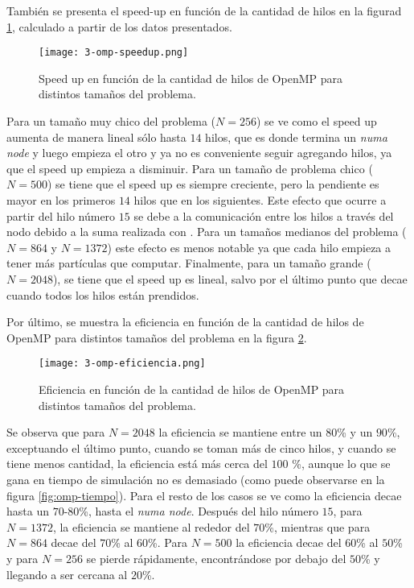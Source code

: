 \documentclass[a4paper,spanish,12pt,twoside]{article}
\begin{document}
También se presenta el speed-up en función de la cantidad de hilos en la figurad \ref{fig:omp-speedup}, calculado a partir de los datos presentados.
\begin{figure}[h]
	\centering
	\texttt{[image: 3-omp-speedup.png]}
	\caption{Speed up en función de la cantidad de hilos de OpenMP para distintos tamaños del problema.}\label{fig:omp-speedup}
\end{figure}
Para un tamaño muy chico del problema ($N=256$) se ve como el speed up aumenta de manera lineal sólo hasta $14$ hilos, que es donde termina un \textit{numa node} y luego empieza el otro y ya no es conveniente seguir agregando hilos, ya que el speed up empieza a disminuir. Para un tamaño de problema chico ($N=500$) se tiene que el speed up es siempre creciente, pero la pendiente es mayor en los primeros $14$ hilos que en los siguientes. Este efecto que ocurre a partir del hilo número $15$ se debe a la comunicación entre los hilos a través del nodo debido a la suma realizada con . Para un tamaños medianos del problema ($N=864$ y $N=1372$) este efecto es menos notable ya que cada hilo empieza a tener más partículas que computar. Finalmente, para un tamaño grande ($N = 2048$), se tiene que el speed up es lineal, salvo por el último punto que decae cuando todos los hilos están prendidos.

Por último, se muestra la eficiencia en función de la cantidad de hilos de OpenMP para distintos tamaños del problema en la figura \ref{fig:omp-eficiencia}.
\begin{figure}[h]
	\centering
	\texttt{[image: 3-omp-eficiencia.png]}
	\caption{Eficiencia en función de la cantidad de hilos de OpenMP para distintos tamaños del problema.}\label{fig:omp-eficiencia}
\end{figure}
Se observa que para $N = 2048$ la eficiencia se mantiene entre un $80$\% y un $90$\%, exceptuando el último punto, cuando se toman más de cinco hilos, y cuando se tiene menos cantidad, la eficiencia está más cerca del $100$ \%, aunque lo que se gana en tiempo de simulación no es demasiado (como puede observarse en la figura \ref{fig:omp-tiempo}). Para el resto de los casos se ve como la eficiencia decae hasta un $70$-$80$\%, hasta el \textit{numa node}. Después del hilo número $15$, para $N = 1372$, la eficiencia se mantiene al rededor del $70$\%, mientras que para $N = 864$ decae del $70$\% al $60$\%. Para $N=500$ la eficiencia decae del $60$\% al $50$\% y para $N=256$ se pierde rápidamente, encontrándose por debajo del $50$\% y llegando a ser cercana al $20$\%.
\end{document}
